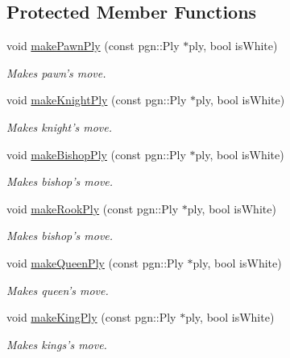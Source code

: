 \subsection*{Protected Member Functions}
\begin{DoxyCompactItemize}
\item 
void \hyperlink{classChEngn_1_1Engine_af414502f81e9abda2d41bd16e3e18ef0}{makePawnPly} (const pgn::Ply $\ast$ply, bool isWhite)
\begin{DoxyCompactList}\small\item\em Makes pawn's move. \item\end{DoxyCompactList}\item 
void \hyperlink{classChEngn_1_1Engine_a9b7fdcf2cf7718e5e602ce6e3be3d4c8}{makeKnightPly} (const pgn::Ply $\ast$ply, bool isWhite)
\begin{DoxyCompactList}\small\item\em Makes knight's move. \item\end{DoxyCompactList}\item 
void \hyperlink{classChEngn_1_1Engine_ae090fc9d1724d63d8af41e5a7c4f1d3d}{makeBishopPly} (const pgn::Ply $\ast$ply, bool isWhite)
\begin{DoxyCompactList}\small\item\em Makes bishop's move. \item\end{DoxyCompactList}\item 
void \hyperlink{classChEngn_1_1Engine_a6ed93f939bbf1cc780a1b2f364068eaa}{makeRookPly} (const pgn::Ply $\ast$ply, bool isWhite)
\begin{DoxyCompactList}\small\item\em Makes bishop's move. \item\end{DoxyCompactList}\item 
void \hyperlink{classChEngn_1_1Engine_a472c2c8efd42dc93027b395df64a71d2}{makeQueenPly} (const pgn::Ply $\ast$ply, bool isWhite)
\begin{DoxyCompactList}\small\item\em Makes queen's move. \item\end{DoxyCompactList}\item 
void \hyperlink{classChEngn_1_1Engine_a6512882396e670361c5b2289e0c85517}{makeKingPly} (const pgn::Ply $\ast$ply, bool isWhite)
\begin{DoxyCompactList}\small\item\em Makes kings's move. \item\end{DoxyCompactList}\item 

\end{DoxyCompactItemize}
